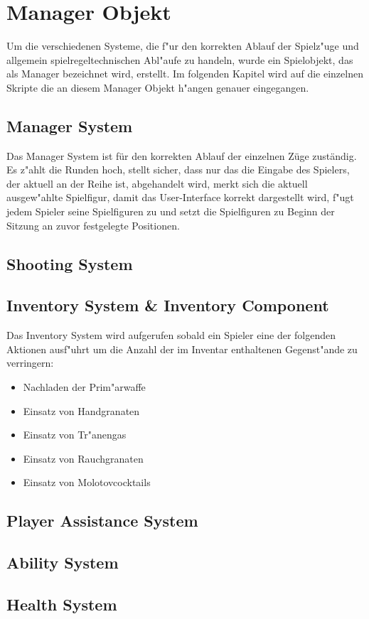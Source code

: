 \chapter{Manager Objekt}

Um die verschiedenen Systeme, die f"ur den korrekten Ablauf der Spielz"uge und allgemein spielregeltechnischen Abl"aufe zu handeln, wurde ein Spielobjekt, das als Manager bezeichnet wird, erstellt. Im folgenden Kapitel wird auf die einzelnen Skripte die an diesem Manager Objekt h"angen genauer eingegangen. 

\section{Manager System}

Das Manager System ist für den korrekten Ablauf der einzelnen Züge zuständig. Es z"ahlt die Runden hoch, stellt sicher, dass nur das die Eingabe des Spielers, der aktuell an der Reihe ist, abgehandelt wird, merkt sich die aktuell ausgew"ahlte Spielfigur, damit das User-Interface korrekt dargestellt wird, f"ugt jedem Spieler seine Spielfiguren zu und setzt die Spielfiguren zu Beginn der Sitzung an zuvor festgelegte Positionen.

\section{Shooting System}



\section{Inventory System \& Inventory Component}

Das Inventory System wird aufgerufen sobald ein Spieler eine der folgenden Aktionen ausf"uhrt um die Anzahl der im Inventar enthaltenen Gegenst"ande zu verringern:\newline


\begin{itemize}
	\item Nachladen der Prim"arwaffe
	\item Einsatz von Handgranaten
	\item Einsatz von Tr"anengas
	\item Einsatz von Rauchgranaten
	\item Einsatz von Molotovcocktails
\end{itemize}

\section{Player Assistance System}



\section{Ability System}



\section{Health System}


